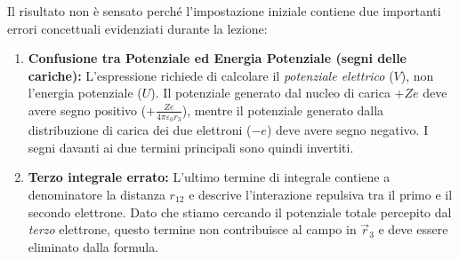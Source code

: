 \begin{exercise}
    \begin{solution}
        Il risultato non è sensato perché l'impostazione iniziale contiene due importanti errori concettuali evidenziati durante la lezione:
        \begin{enumerate}
            \item \textbf{Confusione tra Potenziale ed Energia Potenziale (segni delle cariche):} L'espressione richiede di calcolare il \textit{potenziale elettrico} (\( V \)), non l'energia potenziale (\( U \)). Il potenziale generato dal nucleo di carica \( +Ze \) deve avere segno positivo (\( +\frac{Ze}{4\pi\varepsilon_0 r_3} \)), mentre il potenziale generato dalla distribuzione di carica dei due elettroni (\( -e \)) deve avere segno negativo. I segni davanti ai due termini principali sono quindi invertiti.
            \item \textbf{Terzo integrale errato:} L'ultimo termine di integrale contiene a denominatore la distanza \( r_{12} \) e descrive l'interazione repulsiva tra il primo e il secondo elettrone. Dato che stiamo cercando il potenziale totale percepito dal \textit{terzo} elettrone, questo termine non contribuisce al campo in \( \vec{r}_3 \) e deve essere eliminato dalla formula.
        \end{enumerate}
    \end{solution}
\end{exercise}